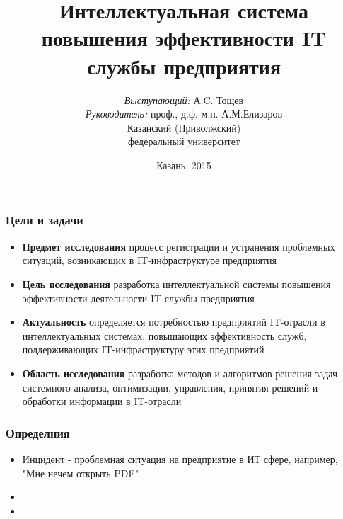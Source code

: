 \documentclass[14pt]{beamer}
\title{\small{Интеллектуальная система повышения эффективности IT службы предприятия}}
\author{\small{%
\emph{Выступающий:} А.C. Тощев\\%
\emph{Руководитель:} проф., д.ф.-м.н. А.М.Елизаров}\\%
\vspace{30pt}%
Казанский (Приволжский)\\
федеральный университет%
\vspace{20pt}%
}
\date{\small{Казань, 2015}}
\begin{document}
\maketitle

\begin{frame}
\frametitle{Цели и задачи}
\begin{itemize}
  \item \textbf{Предмет исследования} процесс регистрации и устранения проблемных ситуаций, возникающих в IT-инфраструктуре предприятия 
  \item \textbf{Цель исследования}  разработка интеллектуальной системы повышения эффективности деятельности IT-службы предприятия
  \item \textbf{Актуальность} определяется потребностью предприятий IT-отрасли в интеллектуальных системах, повышающих эффективность служб, поддерживающих IT-инфраструктуру этих предприятий
   \item \textbf{Область исследования} разработка методов и алгоритмов решения задач системного анализа, оптимизации, управления, принятия решений и обработки информации в IT-отрасли %
\end{itemize}
\end{frame}

\begin{frame}
\frametitle{Определния}
\begin{itemize}
  \item Инцидент - проблемная ситуация на предприятие в ИТ сфере, например, "Мне нечем открыть PDF"	
  \item 
  \item   
\end{itemize}
\end{frame}
\end{document}
